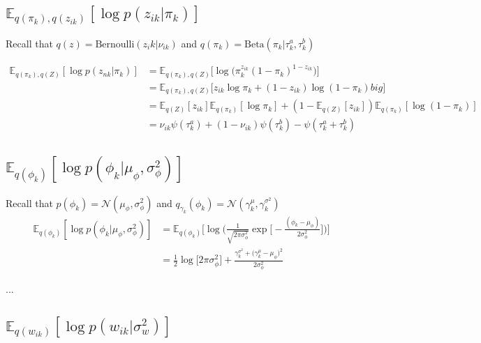 \documentclass[11pt]{article}
\theoremstyle{definition}
\theoremstyle{plain}
\newcommand{\E}{\mathbb{E}}
\newcommand{\Beta}{\text{Beta}}
\newcommand{\Bernoulli}{\text{Bernoulli}}
\begin{document}
\subsection{$\E_{q(\pi_k),q(z_{ik})}[\log p(z_{ik}|\pi_k)]$}

\noindent Recall that $q(z) = \Bernoulli(z_ik|\nu_{ik})$ and $q(\pi_k) = \Beta(\pi_k|\tau_k^a,\tau_k^b)$

\begin{align*}
    \E_{q(\pi_k),q(Z)}[\log p (z_{nk}|\pi_k)] 
        &= \E_{q(\pi_k),q(Z)}\big[\log \big(\pi_k^{z_{ik}}(1 - \pi_k)^{1 - z_{ik}}\big)\big]\\
        &= \E_{q(\pi_k),q(Z)}\big[ z_{ik} \log \pi_k + (1 - z_{ik})\log(1 - \pi_k) big]\\
        &= \E_{q(Z)}[z_{ik}] \E_{q(\pi_k)}[\log \pi_k] +  
            (1 - \E_{q(Z)}[z_{ik}]) \E_{q(\pi_k)}[\log(1 - \pi_k)]\\
        &= \nu_{ik} \psi(\tau_k^a) + (1 - \nu_{ik})\psi(\tau_k^b) - \psi(\tau_k^a + \tau_k^b)
\end{align*}






\subsection{$\E_{q(\phi_k)}[\log p(\phi_k|\mu_{\phi},\sigma^2_\phi)]$}


\noindent Recall that $p(\phi_k) = \mathcal{N}(\mu_{\phi},\sigma^2_{\phi})$
and $q_{\gamma_k}(\phi_k) = 
\mathcal{N}(\gamma_{k}^{\mu}, \gamma_{k}^{\sigma^2})$\\

\begin{align*}
    \E_{q(\phi_k)}[\log p(\phi_k|\mu_{\phi},\sigma^2_\phi)] &=
        \E_{q(\phi_k)}
            \Big[%
            \log \Big(%
                \frac{1}{\sqrt{2 \pi \sigma^2_\phi}} \exp 
                \big[-\frac{(\phi_k - \mu_{\phi})}{2 \sigma^2_\phi}\big]
            \Big)%
            \Big]%
            \\
       &= \frac{1}{2} \log \Big[2 \pi \sigma^2_{\phi} \Big]
          + \frac{\gamma_{k}^{\sigma^2} + \big(\gamma_k^{\mu} - 
          \mu_{\phi} \big)^2}{2 \sigma^2_{\phi}}
\end{align*}


...

\subsection{$\E_{q(w_{ik})}[ \log p(w_{ik}|\sigma^2_w)]$}
\end{document}
